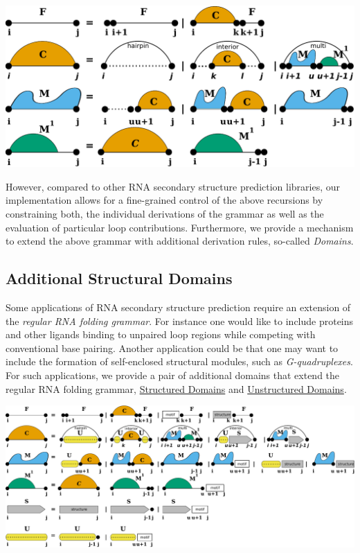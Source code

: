  
\begin{DoxyImageNoCaption}
  \mbox{\includegraphics[width=\textwidth,height=\textheight/2,keepaspectratio=true]{recursions}}
\end{DoxyImageNoCaption}


However, compared to other R\+NA secondary structure prediction libraries, our implementation allows for a fine-\/grained control of the above recursions by constraining both, the individual derivations of the grammar as well as the evaluation of particular loop contributions. Furthermore, we provide a mechanism to extend the above grammar with additional derivation rules, so-\/called {\itshape Domains}.\hypertarget{folding_grammar_sec_domains}{}\subsection{Additional Structural Domains}\label{folding_grammar_sec_domains}
Some applications of R\+NA secondary structure prediction require an extension of the {\itshape regular R\+NA folding grammar}. For instance one would like to include proteins and other ligands binding to unpaired loop regions while competing with conventional base pairing. Another application could be that one may want to include the formation of self-\/enclosed structural modules, such as {\itshape G-\/quadruplexes}. For such applications, we provide a pair of additional domains that extend the regular R\+NA folding grammar, \hyperlink{group__domains__struc}{Structured Domains} and \hyperlink{group__domains__up}{Unstructured Domains}.

 
\begin{DoxyImageNoCaption}
  \mbox{\includegraphics[width=\textwidth,height=\textheight/2,keepaspectratio=true]{GCrecursion}}
\end{DoxyImageNoCaption}



